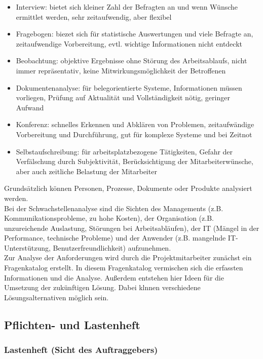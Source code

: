 \documentclass[a4paper, 12pt]{report}
\begin{document}
\begin{multicols}{2}
\begin{itemize}
    \item Interview: bietet sich kleiner Zahl der Befragten an und wenn Wünsche
	ermittlet werden, sehr zeitaufwendig, aber flexibel
    \item Fragebogen: biezet sich für statistische Auswertungen und viele
	Befragte an, zeitaufwendige Vorbereitung, evtl. wichtige Informationen
	nicht entdeckt
    \item Beobachtung: objektive Ergebnisse ohne Störung des Arbeitsablaufs,
	nicht immer repräsentativ, keine Mitwirkungsmöglichkeit der Betroffenen
    \item Dokumentenanalyse: für belegorientierte Systeme, Informationen müssen
	vorliegen, Prüfung auf Aktualität und Vollständigkeit nötig, geringer
	Aufwand
    \item Konferenz: schnelles Erkennen und Abklären von Problemen,
	zeitaufwändige Vorbereitung und Durchführung, gut für komplexe Systeme
	und bei Zeitnot
    \item Selbstaufschreibung: für arbeitsplatzbezogene Tätigkeiten, Gefahr der
	Verfälschung durch Subjektivität, Berücksichtigung der
	Mitarbeiterwünsche, aber auch zeitliche Belastung der Mitarbeiter
\end{itemize}

Grundsätzlich können Personen, Prozesse, Dokumente oder Produkte analysiert
werden. \\

Bei der Schwachstellenanalyse sind die Sichten des Managements (z.B.
Kommunikationsprobleme, zu hohe Kosten), der Organisation (z.B. unzureichende
Auslastung, Störungen bei Arbeitsabläufen), der IT (Mängel in der Performance,
technische Probleme) und der Anwender (z.B. mangelnde IT-Unterstützung,
Benutzerfreundlichkeit) aufzunehmen. \\

Zur Analyse der Anforderungen wird durch die Projektmitarbeiter zunächst ein
Fragenkatalog erstellt. In diesem Fragenkatalog vermischen sich die erfassten
Informationen und die Analyse. Außerdem entstehen hier Ideen für die Umsetzung
der zukünftigen Lösung. Dabei klnnen verschiedene Lösungsalternativen möglich
sein. \\

\subsection{Pflichten- und Lastenheft}

\subsubsection{Lastenheft (Sicht des Auftraggebers)}


\end{multicols}
\end{document}
